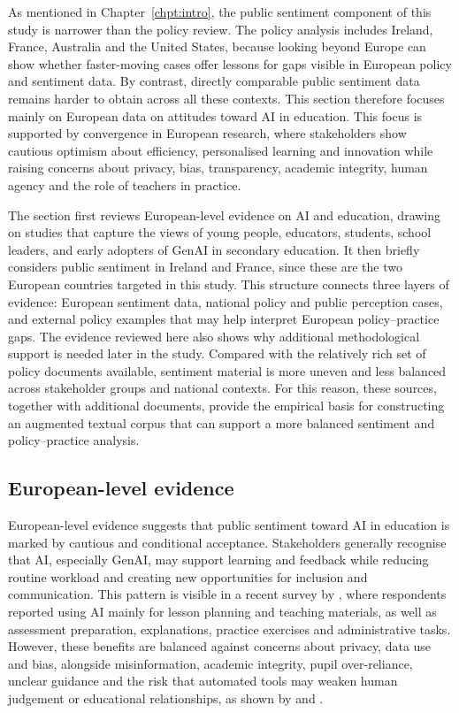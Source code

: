As mentioned in Chapter~\ref{chpt:intro}, the public sentiment component of this
study is narrower than the policy review. The policy analysis includes Ireland,
France, Australia and the United States, because looking beyond Europe can show
whether faster-moving cases offer lessons for gaps visible in European policy and
sentiment data. By contrast, directly comparable public sentiment data remains harder
to obtain across all these contexts. This section therefore focuses mainly on
European data on attitudes toward AI in education. This focus is supported by
convergence in European research, where stakeholders show cautious optimism about
efficiency, personalised learning and innovation while raising concerns about
privacy, bias, transparency, academic integrity, human agency and the role of
teachers in practice.

The section first reviews European-level evidence on AI and education, drawing on
studies that capture the views of young people, educators, students, school leaders,
and early adopters of GenAI in secondary education. It then briefly considers public
sentiment in Ireland and France, since these are the two European countries targeted
in this study. This structure connects three layers of evidence: European sentiment
data, national policy and public perception cases, and external policy examples that
may help interpret European policy--practice gaps. The evidence reviewed here also
shows why additional methodological support is needed later in the study. Compared
with the relatively rich set of policy documents available, sentiment material is
more uneven and less balanced across stakeholder groups and national contexts. For
this reason, these sources, together with additional documents, provide the empirical
basis for constructing an augmented textual corpus that can support a more balanced
sentiment and policy--practice analysis.

\subsection{European-level evidence}

European-level evidence suggests that public sentiment toward AI in education is
marked by cautious and conditional acceptance. Stakeholders generally recognise that
AI, especially GenAI, may support learning and feedback while reducing routine
workload and creating new opportunities for inclusion and communication. This pattern
is visible in a recent survey by \cite{esep2026aisurvey}, where respondents reported
using AI mainly for lesson planning and teaching materials, as well as assessment
preparation, explanations, practice exercises and administrative tasks. However,
these benefits are balanced against concerns about privacy, data use and bias,
alongside misinformation, academic integrity, pupil over-reliance, unclear guidance
and the risk that automated tools may weaken human judgement or educational
relationships, as shown by \cite{stefan2024aiyouth} and \cite{villar2025genai}.


